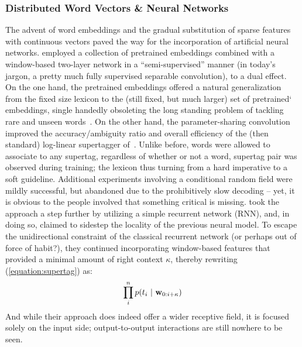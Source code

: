\subsubsection{Distributed Word Vectors \& Neural Networks}
The advent of word embeddings and the gradual substitution of sparse features with continuous vectors paved the way for the incorporation of artificial neural networks.
\citet{10.1162/tacl_a_00186} employed a collection of pretrained embeddings combined with a window-based two-layer network in a ``semi-supervised'' manner (in today's jargon, a pretty much fully supervised separable convolution), to a dual effect.
On the one hand, the pretrained embeddings offered a natural generalization from the fixed size lexicon to the (still fixed, but much larger) set of pretrained` embeddings, single handedly obsoleting the long standing problem of tackling rare and unseen words~\cite{thomforde-steedman-2011-semi,deoskar-etal-2011-learning,deoskar2014generalizing}.
On the other hand, the parameter-sharing convolution improved the accuracy/ambiguity ratio and overall efficiency of the (then standard) log-linear supertagger of~\citet{clark2007wide}.
Unlike before, words were allowed to associate to any supertag, regardless of whether or not a \textlangle word, supertag\textrangle{} pair was observed during training; the lexicon thus turning from a hard imperative to a soft guideline.
Additional experiments involving a conditional random field were mildly successful, but abandoned due to the prohibitively slow decoding -- yet, it is obvious to the people involved that something critical is missing.
\citet{xu-etal-2015-ccg} took the approach a step further by utilizing a simple recurrent network (RNN), and, in doing so, claimed to sidestep the locality of the previous neural model.
To escape the unidirectional constraint of the classical recurrent network (or perhaps out of force of habit?), they continued incorporating window-based features that provided a minimal amount of right context $\kappa$, thereby rewriting (\ref{equation:supertag}) as:
\begin{equation}
	\prod_i^n p(t_i \ | \ \seq{w}{0:i+\kappa})
\end{equation}
And while their approach does indeed offer a wider receptive field, it is focused solely on the input side; output-to-output interactions are still nowhere to be seen.

